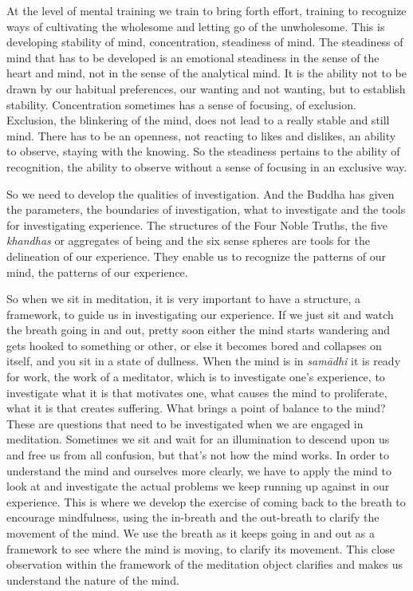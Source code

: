 At the level of mental training we train to bring forth effort, training
to recognize ways of cultivating the wholesome and letting go of the
unwholesome. This is developing stability of mind, concentration,
steadiness of mind. The steadiness of mind that has to be developed is
an emotional steadiness in the sense of the heart and mind, not in the
sense of the analytical mind. It is the ability not to be drawn by our
habitual preferences, our wanting and not wanting, but to establish
stability. Concentration sometimes has a sense of focusing, of
exclusion. Exclusion, the blinkering of the mind, does not lead to a
really stable and still mind. There has to be an openness, not reacting
to likes and dislikes, an ability to observe, staying with the knowing.
So the steadiness pertains to the ability of recognition, the ability to
observe without a sense of focusing in an exclusive way.

So we need to develop the qualities of investigation. And the Buddha has
given the parameters, the boundaries of investigation, what to
investigate and the tools for investigating experience. The structures
of the Four Noble Truths, the five \emph{khandhas} or aggregates of
being and the six sense spheres are tools for the delineation of our
experience. They enable us to recognize the patterns of our mind, the
patterns of our experience.

So when we sit in meditation, it is very important to have a structure,
a framework, to guide us in investigating our experience. If we just sit
and watch the breath going in and out, pretty soon either the mind
starts wandering and gets hooked to something or other, or else it
becomes bored and collapses on itself, and you sit in a state of
dullness. When the mind is in \emph{samādhi} it is ready for work, the
work of a meditator, which is to investigate one's experience, to
investigate what it is that motivates one, what causes the mind to
proliferate, what it is that creates suffering. What brings a point of
balance to the mind? These are questions that need to be investigated
when we are engaged in meditation. Sometimes we sit and wait for an
illumination to descend upon us and free us from all confusion, but
that's not how the mind works. In order to understand the mind and
ourselves more clearly, we have to apply the mind to look at and
investigate the actual problems we keep running up against in our
experience. This is where we develop the exercise of coming back to the
breath to encourage mindfulness, using the in-breath and the out-breath
to clarify the movement of the mind. We use the breath as it keeps going
in and out as a framework to see where the mind is moving, to clarify
its movement. This close observation within the framework of the
meditation object clarifies and makes us understand the nature of the
mind.


